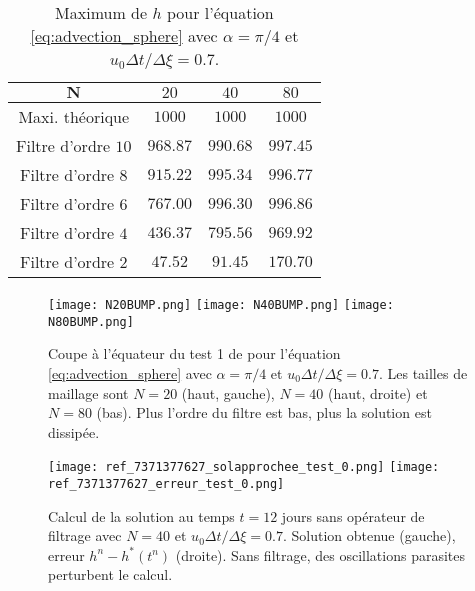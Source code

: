 \begin{table}[htbp]
\begin{center}
\begin{tabular}{|c||ccc|}
\hline 
$\mathbf{N}$ & $20$ & $40$ & $80$ \\ 
\hline 
\hline 
Maxi. théorique & $1000$ & $1000$ & $1000$ \\ 
Filtre d'ordre $10$ & $968.87$ & $990.68$ & $997.45$ \\ 
Filtre d'ordre $8$ & $915.22$ & $995.34$ & $996.77$ \\ 
Filtre d'ordre $6$ & $767.00$ & $996.30$ & $996.86$ \\  
Filtre d'ordre $4$ & $436.37$ & $795.56$ & $969.92$ \\ 
Filtre d'ordre $2$ & $47.52$ & $91.45$ & $170.70$ \\ 
\hline 
\end{tabular} 
\end{center}
\caption{Maximum de $h$ pour l'équation \eqref{eq:advection_sphere} avec $\alpha = \pi / 4$ et $u_0 \Delta t / \Delta \xi = 0.7$.}
\label{tab:max_bump}
\end{table} 

\begin{figure}[htbp]
\begin{center}
\texttt{[image: N20BUMP.png]}
\texttt{[image: N40BUMP.png]}
\texttt{[image: N80BUMP.png]}
\end{center}
\caption{Coupe à l'équateur du test 1 de \cite{Williamson1992} pour l'équation \eqref{eq:advection_sphere} avec $\alpha = \pi / 4$ et $u_0 \Delta t / \Delta \xi = 0.7$. Les tailles de maillage sont $N=20$ (haut, gauche), $N=40$ (haut, droite) et $N=80$ (bas). Plus l'ordre du filtre est bas, plus la solution est dissipée.}
\label{fig:max_bump}
\end{figure}

\begin{figure}[htbp]
\begin{center}
\texttt{[image: ref\_7371377627\_solapprochee\_test\_0.png]}
\texttt{[image: ref\_7371377627\_erreur\_test\_0.png]}
\end{center}
\caption{Calcul de la solution au temps $t=12$ jours sans opérateur de filtrage avec $N=40$ et $u_0 \Delta t/ \Delta \xi = 0.7$. Solution obtenue (gauche), erreur $h^n - h^*(t^n)$ (droite). Sans filtrage, des oscillations parasites perturbent le calcul.}
\label{fig:parasite_bump}
\end{figure}

